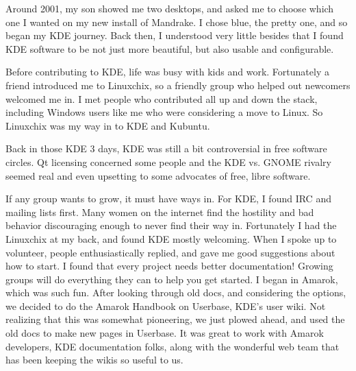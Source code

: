 

\noindent{}Around 2001, my son showed me two desktops, and asked me to choose which one I wanted on my new install of Mandrake. I chose blue, the pretty one, and so began my KDE journey. Back then, I understood very little besides that I found KDE software to be not just more beautiful, but also usable and configurable. 

Before contributing to KDE, life was busy with kids and work. Fortunately a friend introduced me to Linuxchix, so a friendly group who helped out newcomers welcomed me in. I met people who contributed all up and down the stack, including Windows users like me who were considering a move to Linux. So Linuxchix was my way in to KDE and Kubuntu.

Back in those KDE 3 days, KDE was still a bit controversial in free software circles. Qt licensing concerned some people and the KDE vs. GNOME rivalry seemed real and even upsetting to some advocates of free, libre software.

If any group wants to grow, it must have ways in. For KDE, I found IRC and mailing lists first. Many women on the internet find the hostility and bad behavior discouraging enough to never find their way in. Fortunately I had the Linuxchix at my back, and found KDE mostly welcoming. When I spoke up to volunteer, people enthusiastically replied, and gave me good suggestions about how to start. I found that every project needs better documentation! Growing groups will do everything they can to help you get started. I began in Amarok, which was such fun. After looking through old docs, and considering the options, we decided to do the Amarok Handbook on Userbase, KDE's user wiki. Not realizing that this was somewhat pioneering, we just plowed ahead, and used the old docs to make new pages in Userbase. It was great to work with Amarok developers, KDE documentation folks, along with the wonderful web team that has been keeping the wikis so useful to us. 

